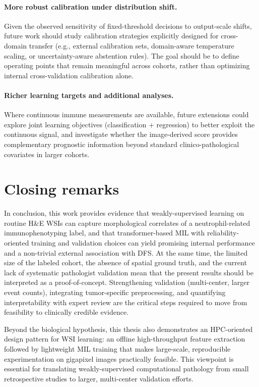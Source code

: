 \paragraph{More robust calibration under distribution shift.}
Given the observed sensitivity of fixed-threshold decisions to output-scale shifts, future work should study calibration strategies explicitly designed for cross-domain transfer (e.g., external calibration sets, domain-aware temperature scaling, or uncertainty-aware abstention rules). The goal should be to define operating points that remain meaningful across cohorts, rather than optimizing internal cross-validation calibration alone.

\paragraph{Richer learning targets and additional analyses.}
Where continuous immune measurements are available, future extensions could explore joint learning objectives (classification + regression) to better exploit the continuous signal, and investigate whether the image-derived score provides complementary prognostic information beyond standard clinico-pathological covariates in larger cohorts.

\section{Closing remarks}
In conclusion, this work provides evidence that weakly-supervised learning on routine H\&E WSIs can capture morphological correlates of a neutrophil-related immunophenotyping label, and that transformer-based MIL with reliability-oriented training and validation choices can yield promising internal performance and a non-trivial external association with DFS.
At the same time, the limited size of the labeled cohort, the absence of spatial ground truth, and the current lack of systematic pathologist validation mean that the present results should be interpreted as a proof-of-concept.
Strengthening validation (multi-center, larger event counts), integrating tumor-specific preprocessing, and quantifying interpretability with expert review are the critical steps required to move from feasibility to clinically credible evidence.

Beyond the biological hypothesis, this thesis also demonstrates an HPC-oriented design pattern for WSI learning: an offline high-throughput feature extraction followed by lightweight MIL training that makes large-scale, reproducible experimentation on gigapixel images practically feasible. This viewpoint is essential for translating weakly-supervised computational pathology from small retrospective studies to larger, multi-center validation efforts.

